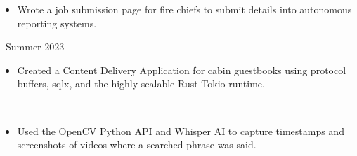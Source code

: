 \documentclass[11pt,letterpaper,ragged2e]{altacv}
\begin{document}
{
\begin{itemize}
    \item Wrote a job submission page for fire chiefs to submit details into autonomous reporting systems.
\end{itemize}
}
{\faCalendar\, Summer 2023} \
 \medskip

\vspace{6pt} %

{
\begin{itemize}
  \item Created a Content Delivery Application for cabin guestbooks using protocol buffers, sqlx, and the highly scalable Rust Tokio runtime.
\end{itemize}
}
{} \
\medskip



{
\begin{itemize}
    \item Used the OpenCV Python API and Whisper AI to capture timestamps and screenshots of videos where a searched phrase was said.
\end{itemize}
}
{} \

{} \

\clearpage

\nocite{*}
\end{document}
